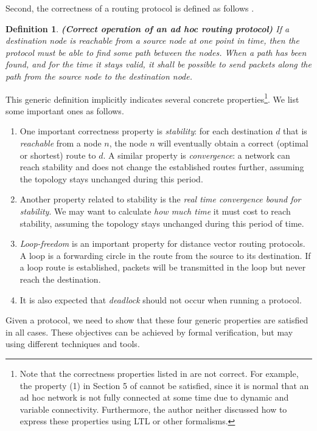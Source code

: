 \documentclass[a4paper,10pt,twocolumn]{article}
\newtheorem{definition}[theorem]{Definition}
\begin{document}
Second, the correctness of a routing protocol is defined as follows \cite{WPP04}.
\begin{definition}
\textbf{\emph{(Correct operation of an ad hoc routing protocol)}} If a destination node is reachable from a source node at one point in time, then the protocol must be able to find some path between the nodes. When a path has been found, and for the time it stays valid, it shall be possible to send packets along the path from the source node to the destination node.
\end{definition}
This generic definition implicitly indicates several concrete properties\footnote{Note that the correctness properties listed in \cite{Ole05} are not correct. For example, the property (1) in Section 5 of \cite{Ole05} cannot be satisfied, since it is normal that an ad hoc network is not fully connected at some time due to dynamic and variable connectivity. Furthermore, the author neither discussed how to express these properties using LTL or other formalisms.}. We list some important ones as follows.
\begin{enumerate}
  \item One important correctness property is \emph{stability}: for each destination $d$ that is \emph{reachable} from a node $n$, the node $n$ will eventually obtain a correct (optimal or shortest) route to $d$. A similar property is \emph{convergence}: a network can reach stability and does not change the established routes further, assuming the topology stays unchanged during this period.
  \item Another property related to stability is the \emph{real time convergence bound for stability}. We may want to calculate \emph{how much time} it must cost to reach stability, assuming the topology stays unchanged during this period of time.
  \item \emph{Loop-freedom} is an important property for distance vector routing protocols. A loop is a forwarding circle in the route from the source to its destination. If a loop route is established, packets will be transmitted in the loop but never reach the destination.
  \item It is also expected that \emph{deadlock} should not occur when running a protocol.
\end{enumerate}

Given a protocol, we need to show that these four generic properties are satisfied in all cases. These objectives can be achieved by formal verification, but may using different techniques and tools.
\end{document}

